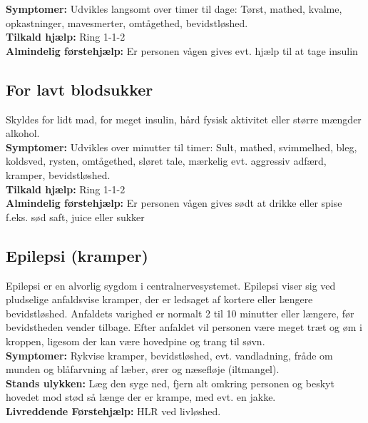 \documentclass[../../../main.tex]{subfiles}
\begin{document}
\begin{multicols}{2}
\textbf{Symptomer:} Udvikles langsomt over timer til dage: Tørst, mathed, kvalme, opkastninger, mavesmerter, omtågethed, bevidstløshed.
\\

\textbf{Tilkald hjælp:} Ring 1-1-2
\\

\textbf{Almindelig førstehjælp:} Er personen vågen gives evt. hjælp til at tage insulin\\

\subsection*{For lavt blodsukker} Skyldes for lidt mad, for meget insulin, hård fysisk aktivitet eller større mængder alkohol.
\\

\textbf{Symptomer:} Udvikles over minutter til timer: Sult, mathed, svimmelhed, bleg, koldsved, rysten, omtågethed, sløret tale, mærkelig evt. aggressiv adfærd, kramper, bevidstløshed.
\\

\textbf{Tilkald hjælp:} Ring 1-1-2
\\

\textbf{Almindelig førstehjælp:} Er personen vågen gives sødt at drikke eller spise f.eks. sød saft, juice eller sukker
\\

\subsection*{Epilepsi (kramper)} Epilepsi er en alvorlig sygdom i centralnervesystemet. Epilepsi viser sig ved pludselige anfaldsvise kramper, der er ledsaget af kortere eller længere bevidstløshed. Anfaldets varighed er normalt 2 til 10 minutter eller længere, før bevidstheden vender tilbage. Efter anfaldet vil personen være meget træt og øm i kroppen, ligesom der kan være hovedpine og trang til søvn.
\\

\textbf{Symptomer:} Rykvise kramper, bevidstløshed, evt. vandladning, fråde om munden og blåfarvning af læber, ører og næsefløje (iltmangel).
\\

\textbf{Stands ulykken:} Læg den syge ned, fjern alt omkring personen og beskyt hovedet mod stød så længe der er krampe, med evt. en jakke.
\\

\textbf{Livreddende Førstehjælp:} HLR ved livløshed.
\\


\end{multicols}
\end{document}
